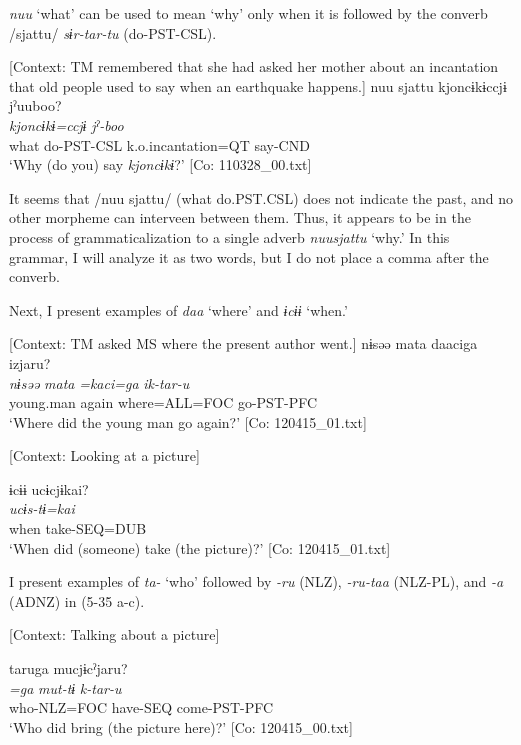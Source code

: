 \textit{nuu} ‘what’ can be used to mean ‘why’ only when it is followed by the converb /sjattu/ \textit{sɨr-tar-tu} (do-PST-CSL).

\ea \label{ex:5:33}   [Context: TM remembered that she had asked her mother about an incantation that old people used to say when an earthquake happens.]
\glll  nuu  sjattu  {\textbar}kjoncɨkɨ{\textbar}ccjɨ  jˀuuboo?\\
\textit{}  \textit{}  \textit{kjoncɨkɨ=ccjɨ}  \textit{jˀ-boo}\\
what  do-PST-CSL  k.o.incantation=QT  say-CND\\
\glt ‘Why (do you) say \textit{kjoncɨkɨ}?’ [Co: 110328\_00.txt]
\z

It seems that /nuu sjattu/ (what do.PST.CSL) does not indicate the past, and no other morpheme can interveen between them. Thus, it appears to be in the process of grammaticalization to a single adverb \textit{nuusjattu} ‘why.’ In this grammar, I will analyze it as two words, but I do not place a comma after the converb.

  Next, I present examples of \textit{daa} ‘where’ and \textit{ɨcɨɨ} ‘when.’

\ea \label{ex:5:34}  \ea \label{ex:5:a} [Context: TM asked MS where the present author went.]
\glll  nɨsəə  mata  daaciga  izjaru?\\
\textit{nɨsəə}  \textit{mata}  \textit{=kaci=ga}  \textit{ik-tar-u}\\
young.man  again  where=ALL=FOC  go-PST-PFC\\
\glt ‘Where did the young man go again?’ [Co: 120415\_01.txt]

 \ex \label{ex:5:b} [Context: Looking at a picture]

\glll  ɨcɨɨ  ucɨcjɨkai?\\
\textit{}  \textit{ucɨs-tɨ=kai}\\
when  take-SEQ=DUB\\
\glt ‘When did (someone) take (the picture)?’ [Co: 120415\_01.txt]
\z
\z

  I present examples of \textit{ta-} ‘who’ followed by \textit{{}-ru} (NLZ), \textit{{}-ru-taa} (NLZ-PL), and \textit{{}-a} (ADNZ) in (5-35 a-c).

\ea \label{ex:5:35}  \ea \label{ex:5:a} [Context: Talking about a picture]

\glll  taruga  mucjɨ\footnotemark  cˀjaru?\\
\textit{=ga}  \textit{mut-tɨ}  \textit{k-tar-u}\\
who-NLZ=FOC  have-SEQ  come-PST-PFC\\
\glt ‘Who did bring (the picture here)?’ [Co: 120415\_00.txt]

